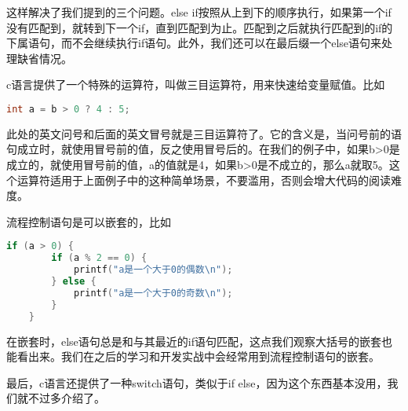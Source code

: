 这样解决了我们提到的三个问题。else if按照从上到下的顺序执行，如果第一个if没有匹配到，就转到下一个if，直到匹配到为止。匹配到之后就执行匹配到的if的下属语句，而不会继续执行if语句。此外，我们还可以在最后缀一个else语句来处理缺省情况。

c语言提供了一个特殊的运算符，叫做三目运算符，用来快速给变量赋值。比如

\begin{lstlisting}[language=C]
    int a = b > 0 ? 4 : 5;
\end{lstlisting}

此处的英文问号和后面的英文冒号就是三目运算符了。它的含义是，当问号前的语句成立时，就使用冒号前的值，反之使用冒号后的。在我们的例子中，如果b>0是成立的，就使用冒号前的值，a的值就是4，如果b>0是不成立的，那么a就取5。这个运算符适用于上面例子中的这种简单场景，不要滥用，否则会增大代码的阅读难度。

流程控制语句是可以嵌套的，比如

\begin{lstlisting}[language=C]
    if (a > 0) {
        if (a % 2 == 0) {
            printf("a是一个大于0的偶数\n");
        } else {
            printf("a是一个大于0的奇数\n");
        }
    }
\end{lstlisting}

在嵌套时，else语句总是和与其最近的if语句匹配，这点我们观察大括号的嵌套也能看出来。我们在之后的学习和开发实战中会经常用到流程控制语句的嵌套。

最后，c语言还提供了一种switch语句，类似于if else，因为这个东西基本没用，我们就不过多介绍了。
